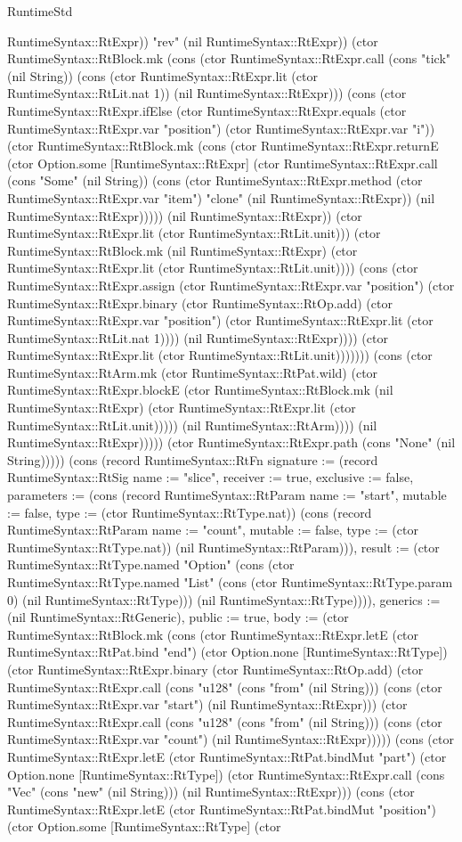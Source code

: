 \begin{lexlean}{RuntimeStd}
\begin{semanticmodule}
{RuntimeSyntax::RtExpr)) "rev" (nil RuntimeSyntax::RtExpr)) (ctor RuntimeSyntax::RtBlock.mk (cons (ctor RuntimeSyntax::RtExpr.call (cons "tick" (nil String)) (cons (ctor RuntimeSyntax::RtExpr.lit (ctor RuntimeSyntax::RtLit.nat 1)) (nil RuntimeSyntax::RtExpr))) (cons (ctor RuntimeSyntax::RtExpr.ifElse (ctor RuntimeSyntax::RtExpr.equals (ctor RuntimeSyntax::RtExpr.var "position") (ctor RuntimeSyntax::RtExpr.var "i")) (ctor RuntimeSyntax::RtBlock.mk (cons (ctor RuntimeSyntax::RtExpr.returnE (ctor Option.some [RuntimeSyntax::RtExpr] (ctor RuntimeSyntax::RtExpr.call (cons "Some" (nil String)) (cons (ctor RuntimeSyntax::RtExpr.method (ctor RuntimeSyntax::RtExpr.var "item") "clone" (nil RuntimeSyntax::RtExpr)) (nil RuntimeSyntax::RtExpr))))) (nil RuntimeSyntax::RtExpr)) (ctor RuntimeSyntax::RtExpr.lit (ctor RuntimeSyntax::RtLit.unit))) (ctor RuntimeSyntax::RtBlock.mk (nil RuntimeSyntax::RtExpr) (ctor RuntimeSyntax::RtExpr.lit (ctor RuntimeSyntax::RtLit.unit)))) (cons (ctor RuntimeSyntax::RtExpr.assign (ctor RuntimeSyntax::RtExpr.var "position") (ctor RuntimeSyntax::RtExpr.binary (ctor RuntimeSyntax::RtOp.add) (ctor RuntimeSyntax::RtExpr.var "position") (ctor RuntimeSyntax::RtExpr.lit (ctor RuntimeSyntax::RtLit.nat 1)))) (nil RuntimeSyntax::RtExpr)))) (ctor RuntimeSyntax::RtExpr.lit (ctor RuntimeSyntax::RtLit.unit))))))) (cons (ctor RuntimeSyntax::RtArm.mk (ctor RuntimeSyntax::RtPat.wild) (ctor RuntimeSyntax::RtExpr.blockE (ctor RuntimeSyntax::RtBlock.mk (nil RuntimeSyntax::RtExpr) (ctor RuntimeSyntax::RtExpr.lit (ctor RuntimeSyntax::RtLit.unit))))) (nil RuntimeSyntax::RtArm)))) (nil RuntimeSyntax::RtExpr))))) (ctor RuntimeSyntax::RtExpr.path (cons "None" (nil String))))}) (cons (record RuntimeSyntax::RtFn {signature := (record RuntimeSyntax::RtSig {name := "slice", receiver := true, exclusive := false, parameters := (cons (record RuntimeSyntax::RtParam {name := "start", mutable := false, type := (ctor RuntimeSyntax::RtType.nat)}) (cons (record RuntimeSyntax::RtParam {name := "count", mutable := false, type := (ctor RuntimeSyntax::RtType.nat)}) (nil RuntimeSyntax::RtParam))), result := (ctor RuntimeSyntax::RtType.named "Option" (cons (ctor RuntimeSyntax::RtType.named "List" (cons (ctor RuntimeSyntax::RtType.param 0) (nil RuntimeSyntax::RtType))) (nil RuntimeSyntax::RtType)))}), generics := (nil RuntimeSyntax::RtGeneric), public := true, body := (ctor RuntimeSyntax::RtBlock.mk (cons (ctor RuntimeSyntax::RtExpr.letE (ctor RuntimeSyntax::RtPat.bind "end") (ctor Option.none [RuntimeSyntax::RtType]) (ctor RuntimeSyntax::RtExpr.binary (ctor RuntimeSyntax::RtOp.add) (ctor RuntimeSyntax::RtExpr.call (cons "u128" (cons "from" (nil String))) (cons (ctor RuntimeSyntax::RtExpr.var "start") (nil RuntimeSyntax::RtExpr))) (ctor RuntimeSyntax::RtExpr.call (cons "u128" (cons "from" (nil String))) (cons (ctor RuntimeSyntax::RtExpr.var "count") (nil RuntimeSyntax::RtExpr))))) (cons (ctor RuntimeSyntax::RtExpr.letE (ctor RuntimeSyntax::RtPat.bindMut "part") (ctor Option.none [RuntimeSyntax::RtType]) (ctor RuntimeSyntax::RtExpr.call (cons "Vec" (cons "new" (nil String))) (nil RuntimeSyntax::RtExpr))) (cons (ctor RuntimeSyntax::RtExpr.letE (ctor RuntimeSyntax::RtPat.bindMut "position") (ctor Option.some [RuntimeSyntax::RtType] (ctor }
\end{semanticmodule}
\end{lexlean}
